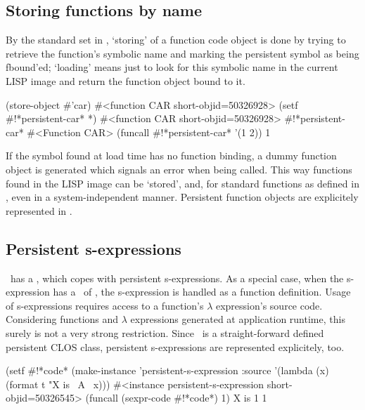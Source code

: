 \subsection{Storing functions by name}

By the standard set in \plob{}, `storing' of a function code object
is done by trying to retrieve the function's symbolic name and marking
the persistent symbol as being fbound'ed; `loading' means just to look
for this symbolic name in the current LISP image and return the
function object bound to it.
\begin{CompactCode}
\listener{}(store-object #'car)
#<function CAR short-objid=50326928>
\listener{}(setf #!*persistent-car* *)
#<function CAR short-objid=50326928>
\listener{}#!*persistent-car*
#<Function CAR>
\listener{}(funcall #!*persistent-car* '(1 2))
1
\end{CompactCode}

If the symbol found at load time has no function binding, a dummy
function object is generated which signals an error when being called.
This way functions found in the LISP image can be `stored', and, for
standard functions as defined in \cite{bib:CLtLII}, even in a
system-independent manner. Persistent function objects are explicitely
represented in \plobwoexcl.

\subsection{Persistent s-expressions}

\plob\ has a , which copes with persistent s-expressions. As a
special case, when the s-expression has a \ of ,
the s-expression is handled as a function definition. Usage of
s-expressions requires access to a function's $\lambda$
expression's source code.  Considering functions and $\lambda$
expressions generated at application runtime, this surely is not a
very strong restriction.  Since \ is a
straight-forward defined persistent CLOS class, persistent
s-expressions are represented explicitely, too.
\begin{CompactCode}
\listener{}(setf #!*code*
               (make-instance 'persistent-s-expression
                              :source '(lambda (x)
                                        (format t "X is ~A~%
                                        x)))
#<instance persistent-s-expression short-objid=50326545>
\listener{}(funcall (sexpr-code #!*code*) 1)
X is 1
1
\end{CompactCode}

